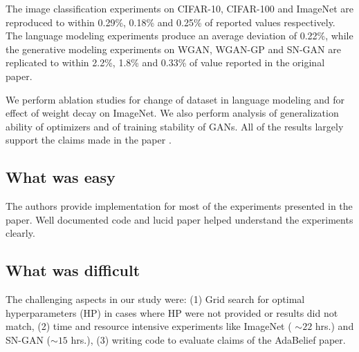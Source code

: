							
The image classification experiments on CIFAR-10, CIFAR-100 and ImageNet are reproduced to within 0.29\%, 0.18\% and 0.25\% of reported values respectively. The language modeling experiments produce an average deviation of 0.22\%, while the generative modeling experiments on WGAN, WGAN-GP and SN-GAN are replicated to within 2.2\%, 1.8\% and 0.33\% of value reported in the original paper.
\par
We perform ablation studies for change of dataset in language modeling and for effect of weight decay on ImageNet. We also perform analysis of generalization ability of optimizers and of training stability of GANs. All of the results largely support the claims made in the paper \cite{zhuang_adabelief_2020}.



\subsection*{What was easy}

The  authors  provide  implementation  for  most  of  the  experiments  presented  in  the  paper.   Well documented code and lucid paper helped understand the experiments clearly.

\subsection*{What was difficult}

The challenging aspects in our study were: (1) Grid search for optimal hyperparameters (HP) in cases where HP were not provided or results did not match, (2) time and resource intensive experiments like ImageNet ( $\sim22$ hrs.) and SN-GAN ($\sim15$ hrs.), (3) writing code to evaluate claims of the AdaBelief paper.


